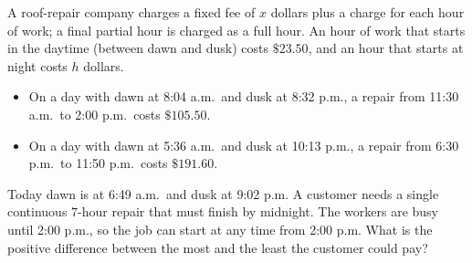 A roof-repair company charges a fixed fee of $x$ dollars plus a charge for each hour of work; a final partial hour is charged as a full hour. An hour of work that starts in the daytime (between dawn and dusk) costs $\$23.50$, and an hour that starts at night costs $h$ dollars.
\begin{itemize}
\item On a day with dawn at 8:04 a.m.\ and dusk at 8:32 p.m., a repair from 11:30 a.m.\ to 2:00 p.m.\ costs $\$105.50$.
\item On a day with dawn at 5:36 a.m.\ and dusk at 10:13 p.m., a repair from 6:30 p.m.\ to 11:50 p.m.\ costs $\$191.60$.
\end{itemize}
Today dawn is at 6:49 a.m.\ and dusk at 9:02 p.m. A customer needs a single continuous $7$-hour repair that must finish by midnight. The workers are busy until 2:00 p.m., so the job can start at any time from 2:00 p.m. What is the positive difference between the most and the least the customer could pay?
